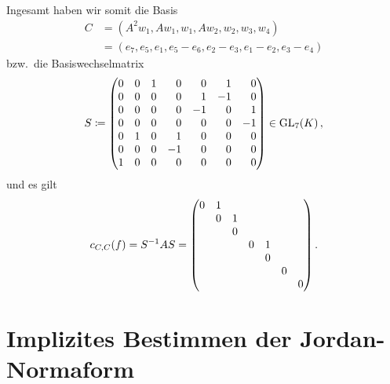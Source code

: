 \documentclass[a4paper,10pt,numbers = noenddot]{scrartcl}
\begin{document}
\begin{example}
  Ingesamt haben wir somit die Basis
  \begin{align*}
        C
    &=  (A^2 w_1, A w_1, w_1, A w_2, w_2, w_3, w_4) \\
    &=  (e_7, e_5, e_1, e_5 - e_6, e_2 - e_3, e_1 - e_2, e_3 - e_4)
  \end{align*}
  bzw.\ die Basiswechselmatrix
  \[
              S
    \defined \begin{pmatrix*}[r]
                0 & 0 & 1 &  0  &  0  &  1  &  0  \\
                0 & 0 & 0 &  0  &  1  & -1  &  0  \\
                0 & 0 & 0 &  0  & -1  &  0  &  1  \\
                0 & 0 & 0 &  0  &  0  &  0  & -1  \\
                0 & 1 & 0 &  1  &  0  &  0  &  0  \\
                0 & 0 & 0 & -1  &  0  &  0  &  0  \\
                1 & 0 & 0 &  0  &  0  &  0  &  0
              \end{pmatrix*}
    \in       \GL{7}{K} \,,
  \]
  und es gilt
  \[
      \repmatrixendo{f}{C}
    = S^{-1} A S
    = \begin{pmatrix}
        0 & 1 &   &   &   &   &   \\
          & 0 & 1 &   &   &   &   \\
          &   & 0 &   &   &   &   \\
          &   &   & 0 & 1 &   &   \\
          &   &   &   & 0 &   &   \\
          &   &   &   &   & 0 &   \\
          &   &   &   &   &   & 0
      \end{pmatrix}.
  \]
\end{example}





\section*{Implizites Bestimmen der Jordan-Normaform}
\end{document}
